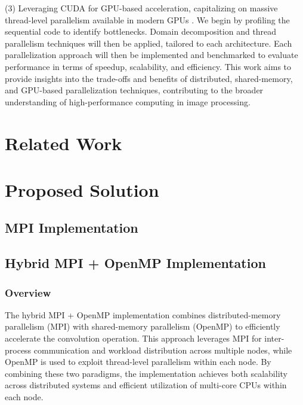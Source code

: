 \documentclass[conference, 10pt]{IEEEtran}
\begin{document}
(3) Leveraging CUDA for GPU-based acceleration,
capitalizing on massive thread-level parallelism available in modern GPUs \cite{nvidia2021cuda}.
We begin by profiling the sequential code to identify bottlenecks. 
Domain decomposition and thread parallelism techniques will then be applied, tailored to each architecture. 
Each parallelization approach will then be implemented and benchmarked 
to evaluate performance in terms of speedup, scalability, and efficiency.
This work aims to provide insights into the trade-offs and benefits of distributed, shared-memory, and GPU-based parallelization techniques, 
contributing to the broader understanding of high-performance computing in image processing.


\section{Related Work}




\section{Proposed Solution}

\subsection{MPI Implementation}









\subsection{Hybrid MPI + OpenMP Implementation}
\subsubsection{Overview}
The hybrid MPI + OpenMP implementation combines distributed-memory parallelism (MPI) with shared-memory parallelism (OpenMP) 
to efficiently accelerate the convolution operation. 
This approach leverages MPI for inter-process communication and workload distribution across multiple nodes, 
while OpenMP is used to exploit thread-level parallelism within each node. 
By combining these two paradigms, the implementation achieves both scalability across distributed systems 
and efficient utilization of multi-core CPUs within each node.
\end{document}
